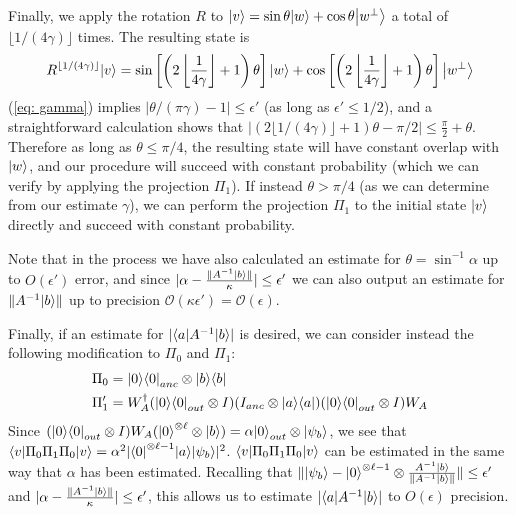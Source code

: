 \documentclass[11pt]{article}
\theoremstyle{definition}
\theoremstyle{remark}
\begin{document}
Finally, we apply the rotation $R$ to ${\left\vert{v}\right\rangle} = \sin \theta {\left\vert{w}\right\rangle} +\cos \theta{\left\vert{w^\perp}\right\rangle}$ a total of $\lfloor1/(4\gamma)\rfloor$ times. The resulting state is
\begin{equation}
R^{\lfloor1/(4\gamma)\rfloor}{\left\vert{v}\right\rangle} = \sin\left[\left(2\left\lfloor\frac{1}{4\gamma}\right\rfloor+1\right)\theta\right] {\left\vert{w}\right\rangle} + \cos\left[\left(2\left\lfloor\frac{1}{4\gamma}\right\rfloor+1\right)\theta\right] {\left\vert{w^\perp}\right\rangle}
\end{equation}
(\ref{eq: gamma}) implies $|\theta/(\pi\gamma) - 1| \le \epsilon'$ (as long as $\epsilon' \le 1/2$), and a straightforward calculation shows that $|(2\lfloor1/(4\gamma)\rfloor+1) \theta - \pi/2| \le \frac{\pi}{2}+\theta$. Therefore as long as $\theta \le \pi/4$, the resulting state will have constant overlap with ${\left\vert{w}\right\rangle}$, and our procedure will succeed with constant probability (which we can verify by applying the projection $\Pi_1$). If instead $\theta > \pi/4$ (as we can determine from our estimate $\gamma$), we can perform the projection $\Pi_1$ to the initial state ${\left\vert{v}\right\rangle}$ directly and succeed with constant probability.

Note that in the process we have also calculated an estimate for $\theta = \sin^{-1}\alpha$ up to $O(\epsilon')$ error, and since $|\alpha - \frac{\|A^{-1}{\left\vert{b}\right\rangle}\|}{\kappa}| \le \epsilon'$ we can also output an estimate for $\|A^{-1}{\left\vert{b}\right\rangle}\|$ up to precision $\mathcal{O}(\kappa \epsilon') = \mathcal{O}(\epsilon)$.

Finally, if an estimate for $|{\left\langle{a}\right\vert} A^{-1} {\left\vert{b}\right\rangle}|$ is desired, we can consider instead the following modification to $\Pi_0$ and $\Pi_1$:
\begin{align}
\Pi_0 &= {\left\vert{0}\right\rangle}{\left\langle{0}\right\vert}_{anc} \otimes {\left\vert{b}\right\rangle}{\left\langle{b}\right\vert} \\
\Pi'_1 &= W_A^\dagger ({\left\vert{0}\right\rangle}{\left\langle{0}\right\vert}_{out} \otimes I) (I_{anc} \otimes {\left\vert{a}\right\rangle}{\left\langle{a}\right\vert})({\left\vert{0}\right\rangle}{\left\langle{0}\right\vert}_{out} \otimes I) W_A
\end{align}
Since $({\left\vert{0}\right\rangle}{\left\langle{0}\right\vert}_{out} \otimes I) W_A ({\left\vert{0}\right\rangle}^{\otimes \ell} \otimes {\left\vert{b}\right\rangle}) = \alpha {\left\vert{0}\right\rangle}_{out} \otimes {\left\vert{\psi_b}\right\rangle}$, we see that ${\left\langle{v}\right\vert}\Pi_0\Pi_1\Pi_0{\left\vert{v}\right\rangle} = \alpha^2|{\left\langle{0}\right\vert}^{\otimes \ell-1} {\left\vert{a}\right\rangle} {\left\vert{\psi_b}\right\rangle}|^2$.
${\left\langle{v}\right\vert}\Pi_0\Pi_1\Pi_0{\left\vert{v}\right\rangle}$ can be estimated in the same way that $\alpha$ has been estimated. Recalling that $\| {\left\vert{\psi_b}\right\rangle} - {\left\vert{0}\right\rangle}^{\otimes \ell-1} \otimes \frac{A^{-1}{\left\vert{b}\right\rangle}} {\|A^{-1}{\left\vert{b}\right\rangle}\|} \| \le \epsilon'$ and $|\alpha - \frac{\|A^{-1}{\left\vert{b}\right\rangle}\|}{\kappa}| \le \epsilon'$, this allows us to estimate $|{\left\langle{a}\right\vert} A^{-1} {\left\vert{b}\right\rangle}|$ to $O(\epsilon)$ precision.
\end{document}
